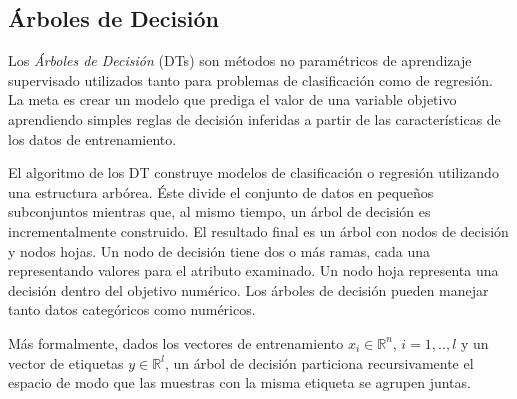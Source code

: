 \subsection{Árboles de Decisión}
  \par Los \textit{Árboles de Decisión} (DTs)\cite{decision_tree_regression}
    son métodos no paramétricos de aprendizaje supervisado
    utilizados tanto para problemas de clasificación como de regresión.
    La meta es crear un modelo que prediga el valor de una variable objetivo aprendiendo
    simples reglas de decisión inferidas a partir de las características de los datos
    de entrenamiento.


  \par El algoritmo de los DT construye modelos de clasificación o regresión
    utilizando una estructura arbórea. Éste divide el conjunto de datos en pequeños
    subconjuntos mientras que, al mismo tiempo, un árbol de decisión es incrementalmente
    construido. El resultado final es un árbol con nodos de decisión y nodos hojas.
    Un nodo de decisión tiene dos o más ramas, cada una representando valores para
    el atributo examinado. Un nodo hoja representa una decisión dentro del
    objetivo numérico. Los árboles de decisión pueden manejar tanto datos
    categóricos como numéricos.


  \par Más formalmente, dados los vectores de entrenamiento $x_{i} \in \mathbb{R}^{n}$, $i = 1,..,l$
    y un vector de etiquetas $y \in \mathbb{R}^{l}$, un árbol de decisión particiona
    recursivamente el espacio de modo que las muestras con la misma etiqueta se agrupen juntas.


